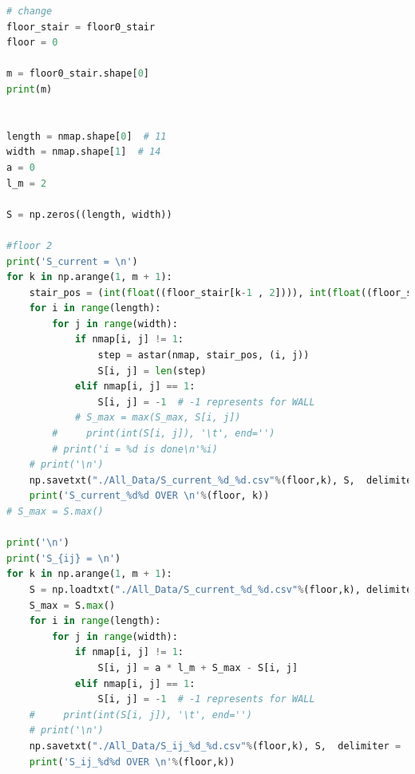 \documentclass{mcmthesis}
\begin{document}
\begin{lstlisting}[language=Python]
# change
floor_stair = floor0_stair
floor = 0

m = floor0_stair.shape[0]
print(m)


length = nmap.shape[0]  # 11
width = nmap.shape[1]  # 14
a = 0
l_m = 2

S = np.zeros((length, width))

#floor 2
print('S_current = \n')
for k in np.arange(1, m + 1):
    stair_pos = (int(float((floor_stair[k-1 , 2]))), int(float((floor_stair[k-1, 3]))))
    for i in range(length):
        for j in range(width):
            if nmap[i, j] != 1:
                step = astar(nmap, stair_pos, (i, j))
                S[i, j] = len(step)
            elif nmap[i, j] == 1:
                S[i, j] = -1  # -1 represents for WALL
            # S_max = max(S_max, S[i, j])
        #     print(int(S[i, j]), '\t', end='')
        # print('i = %d is done\n'%i)
    # print('\n')
    np.savetxt("./All_Data/S_current_%d_%d.csv"%(floor,k), S,  delimiter = ',')
    print('S_current_%d%d OVER \n'%(floor, k))
# S_max = S.max()

print('\n')
print('S_{ij} = \n')
for k in np.arange(1, m + 1):
    S = np.loadtxt("./All_Data/S_current_%d_%d.csv"%(floor,k), delimiter = ',')
    S_max = S.max()
    for i in range(length):
        for j in range(width):
            if nmap[i, j] != 1:
                S[i, j] = a * l_m + S_max - S[i, j]
            elif nmap[i, j] == 1:
                S[i, j] = -1  # -1 represents for WALL
    #     print(int(S[i, j]), '\t', end='')
    # print('\n')
    np.savetxt("./All_Data/S_ij_%d_%d.csv"%(floor,k), S,  delimiter = ',')
    print('S_ij_%d%d OVER \n'%(floor,k))
\end{lstlisting}
\end{document}

